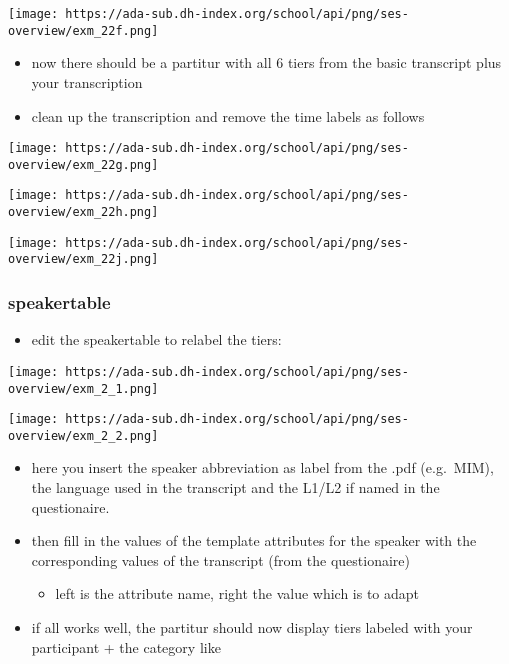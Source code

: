 \documentclass[
  12pt,
]{article}
\providecommand{\tightlist}{%
  \setlength{\itemsep}{0pt}\setlength{\parskip}{0pt}}
\begin{document}
\texttt{[image: https://ada-sub.dh-index.org/school/api/png/ses-overview/exm\_22f.png]}

\begin{itemize}
\tightlist
\item
  now there should be a partitur with all 6 tiers from the basic
  transcript plus your transcription
\item
  clean up the transcription and remove the time labels as follows
\end{itemize}

\texttt{[image: https://ada-sub.dh-index.org/school/api/png/ses-overview/exm\_22g.png]}

\texttt{[image: https://ada-sub.dh-index.org/school/api/png/ses-overview/exm\_22h.png]}

\texttt{[image: https://ada-sub.dh-index.org/school/api/png/ses-overview/exm\_22j.png]}

\hypertarget{speakertable-1}{%
\subsubsection{speakertable}\label{speakertable-1}}

\begin{itemize}
\tightlist
\item
  edit the speakertable to relabel the tiers:
\end{itemize}

\texttt{[image: https://ada-sub.dh-index.org/school/api/png/ses-overview/exm\_2\_1.png]}

\texttt{[image: https://ada-sub.dh-index.org/school/api/png/ses-overview/exm\_2\_2.png]}

\begin{itemize}
\tightlist
\item
  here you insert the speaker abbreviation as label from the .pdf
  (e.g.~MIM), the language used in the transcript and the L1/L2 if named
  in the questionaire.
\item
  then fill in the values of the template attributes for the speaker
  with the corresponding values of the transcript (from the
  questionaire)

  \begin{itemize}
  \tightlist
  \item
    left is the attribute name, right the value which is to adapt
  \end{itemize}
\item
  if all works well, the partitur should now display tiers labeled with
  your participant + the category like
\end{itemize}
\end{document}
